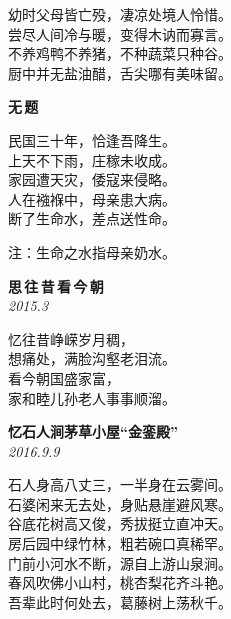 \begin{center}\trueka
幼时父母皆亡殁，凄凉处境人怜惜。\\
尝尽人间冷与暖，变得木讷而寡言。\\
不养鸡鸭不养猪，不种蔬菜只种谷。\\
厨中并无盐油醋，舌尖哪有美味留。
\end{center}

\vspace{1.2em}

\begin{center}
{\trueka\bfseries\large 无\,题}
\end{center}

\begin{center}\trueka
民国三十年，恰逢吾降生。\\
上天不下雨，庄稼未收成。\\
家园遭天灾，倭寇来侵略。\\
人在襁褓中，母亲患大病。\\
断了生命水，差点送性命。
\end{center}

\vspace{0.3em}
\begin{center}
{\footnotesize\color{inkgray}注：生命之水指母亲奶水。}
\end{center}

\vspace{1.6em}

\begin{center}
{\trueka\bfseries\large 思\,往\,昔\,看\,今\,朝}\\[1pt]
{\trueka\small\color{inkgray}\textit{2015.3}}
\end{center}

\begin{center}\trueka
忆往昔峥嵘岁月稠，\\
想痛处，满脸沟壑老泪流。\\
看今朝国盛家富，\\
家和睦儿孙老人事事顺溜。
\end{center}

\vspace{1.6em}

\begin{center}
{\trueka\bfseries\large 忆石人涧茅草小屋“金銮殿”}\\[1pt]
{\trueka\small\color{inkgray}\textit{2016.9.9}}
\end{center}

\begin{center}\trueka
石人身高八丈三，一半身在云雾间。\\
石婆闲来无去处，身贴悬崖避风寒。\\
谷底花树高又俊，秀拔挺立直冲天。\\
房后园中绿竹林，粗若碗口真稀罕。\\
门前小河水不断，源自上游山泉涧。\\
春风吹佛小山村，桃杏梨花齐斗艳。\\
吾辈此时何处去，葛藤树上荡秋千。
\end{center}

